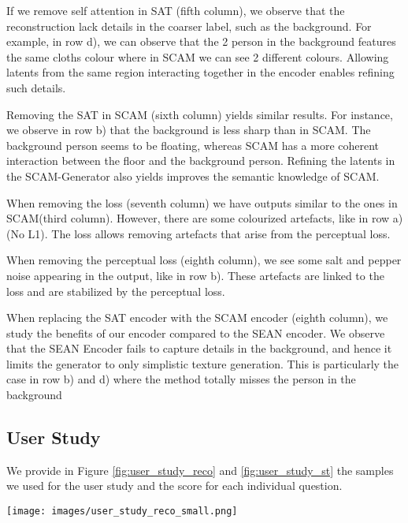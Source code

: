 \documentclass[runningheads]{llncs}
\makeatletter
\newcommand{\mname}{SCAM\@\xspace}
\makeatother
\begin{document}
If we remove self attention in SAT (fifth column), we observe that the reconstruction lack details in the coarser label, such as the background. For example, in row d), we can observe that the 2 person in the background features the same cloths colour where in SCAM we can see 2 different colours. Allowing latents from the same region interacting together in the encoder enables refining such details.

Removing the SAT in SCAM (sixth column) yields similar results. For instance, we observe in row b) that the background is less sharp than in \mname. The background person seems to be floating, whereas \mname has a more coherent interaction between the floor and the background person. Refining the latents in the SCAM-Generator also yields improves the semantic knowledge of SCAM.


When removing the  loss (seventh column) we have outputs similar to the ones in \mname (third column). However, there are some colourized artefacts, like in row a) (No L1). The  loss allows removing artefacts that arise from the perceptual loss.

When removing the perceptual loss (eighth column), we see some salt and pepper noise appearing in the output, like in row b). These artefacts are linked to the  loss and are stabilized by the perceptual loss.

When replacing the SAT encoder with the SCAM encoder (eighth column), we study the benefits of our encoder compared to the SEAN encoder. We observe that the SEAN Encoder fails to capture details in the background, and hence it limits the generator to only simplistic texture generation. This is particularly the case in row b) and d)  where the method totally misses the person in the background

\subsection{User Study}
We provide in Figure \ref{fig:user_study_reco} and \ref{fig:user_study_st} the samples we used for the user study and the score for each individual question.
\begin{figure*}[t!]
    \centering
    \texttt{[image: images/user\_study\_reco\_small.png]}
     \caption{
     \small{\textbf{User study on reconstruction}. 
     We provide here the samples that were used to evaluate the reconstruction quality on SCAM, SEAN and INADE in a user study. Note that we provide here the segmentation mask for reference but it was not provided to users.
     }}
    \label{fig:user_study_reco}
\end{figure*}
\end{document}
